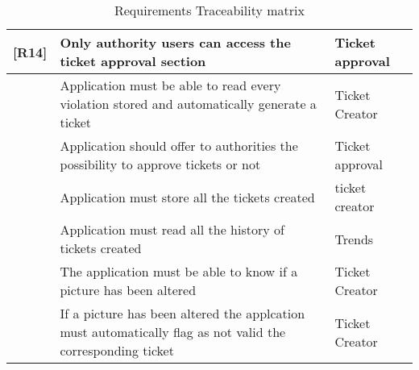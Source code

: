 \begin{table}[H]
\begin {centering}
\begin{tabular}{|l|p{10cm}|p{5cm}|}
[R14] & Only authority users can access the ticket approval section & Ticket approval \\ \hline %
[R15] & Application must be able to read every violation stored and automatically generate a ticket & Ticket Creator\\ \hline %
[R16] & Application should offer to authorities the possibility to approve tickets or not & Ticket approval \\ \hline %
[R17] & Application must store all the tickets created & ticket creator \\ \hline %
[R18] & Application must read all the history of tickets created & Trends \\ \hline %
[R19] & The application must be able to know if a picture has been altered & Ticket Creator \\ \hline %
[R20] & If a picture has been altered the applcation must automatically flag as not valid the corresponding ticket & Ticket Creator \\ \hline %
\end{tabular}
\end{centering}
\caption{Requirements Traceability matrix}
		\label{Traceabilitymatrix}
\end{table}
